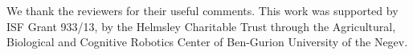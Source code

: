 \documentclass[letterpaper]{article}
\theoremstyle{definition}
\begin{document}
 We thank the reviewers for their useful comments. This work was supported by ISF Grant 933/13, by the Helmsley Charitable Trust through the Agricultural, Biological and Cognitive Robotics Center of Ben-Gurion University of the Negev.



\end{document}
